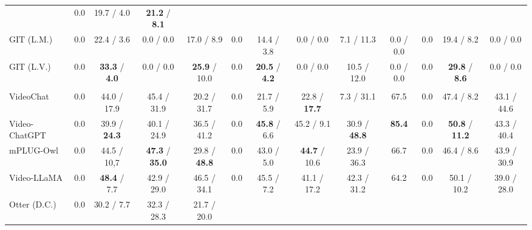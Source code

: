\begin{table}[t]
{{\begin{tabular}{lp{1cm}<{\centering} cccp{1cm}<{\centering}ccccp{1cm}<{\centering}cc}
& 0.0 
& 19.7 / 4.0
& \textbf{21.2} / \textbf{8.1} \\
\rowcolor{C-Model}
GIT (L.M.) \cite{wang2022git} 
& 0.0 
& 22.4 / 3.6
& 0.0 / 0.0
& 17.0 / 8.9

& 0.0 
& 14.4 / 3.8
& 0.0 / 0.0
& 7.1 / 11.3
& 0.0 / 0.0

& 0.0
& 19.4 / 8.2
& 0.0 / 0.0 \\

\rowcolor{C-Model}
GIT (L.V.) \cite{wang2022git} 
& 0.0 
& \textbf{33.3} / \textbf{4.0}
& 0.0 / 0.0
& \textbf{25.9} / 10.0

& 0.0 
& \textbf{20.5} / \textbf{4.2}
& 0.0 / 0.0
& 10.5 / 12.0
& 0.0 / 0.0 

& 0.0 
& \textbf{29.8} / \textbf{8.6}
& 0.0 / 0.0 \\
\midrule
\rowcolor{I-Model}
\multicolumn{13}{l}{\textbf{- Instruction-based Model}} \\
\rowcolor{I-Model}
VideoChat \cite{2023videochat} 
& 0.0 
& 44.0 / 17.9
& 45.4 / 31.9
& 20.2 / 31.7

& 0.0 
& 21.7 / 5.9
& 22.8 / \textbf{17.7}
& 7.3 / 31.1
& 67.5 

& 0.0 
& 47.4 / 8.2
& 43.1 / 44.6 \\


\rowcolor{I-Model}
Video-ChatGPT \cite{maaz2023videochatgpt} 
& 0.0 
& 39.9 / \textbf{24.3}
& 40.1 / 24.9
& 36.5 / 41.2

& 0.0 
& \textbf{45.8} / 6.6
& 45.2 / 9.1
& 30.9 / \textbf{48.8}
& \textbf{85.4} 

& 0.0 
& \textbf{50.8} / \textbf{11.2}
& 43.3 / 40.4 \\


\rowcolor{I-Model}
mPLUG-Owl \cite{ye2023mplugowl} 
& 0.0 
& 44.5 / 10,7
& \textbf{47.3} / \textbf{35.0}
& 29.8 / \textbf{48.8}

& 0.0 
& 43.0 / 5.0
& \textbf{44.7 }/ 10.6
& 23.9 / 36.3
& 66.7 

& 0.0 
& 46.4 / 8.6
& 43.9 / 30.9 \\

\rowcolor{I-Model}
Video-LLaMA \cite{damonlpsg2023videollama} 
& 0.0 
& \textbf{48.4} / 7.7
& 42.9 / 29.0
& 46.5 / 34.1

& 0.0 
& 45.5 / 7.2
& 41.1 / 17.2
& 42.3 / 31.2
& 64.2 

& 0.0 
& 50.1 / 10.2
& 39.0 / 28.0 \\

\rowcolor{I-Model}
Otter (D.C.) \cite{li2023otter} 
& 0.0 
& 30.2 / 7.7
& 32.3 / 28.3
& 21.7 / 20.0


\end{tabular}}}
\end{table}
